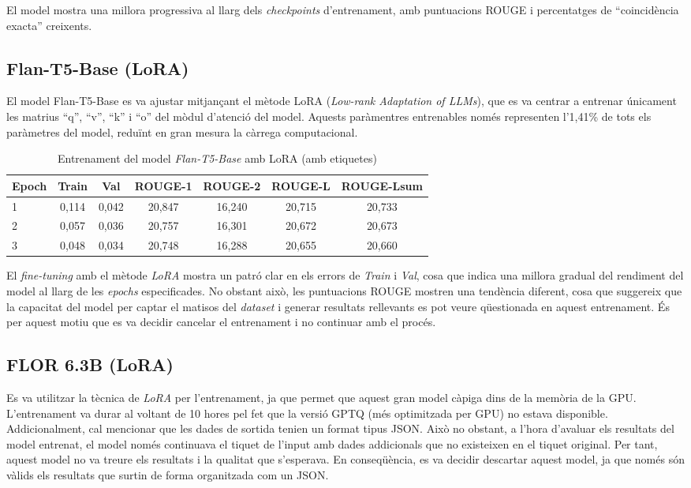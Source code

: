 El model mostra una millora progressiva al llarg dels \textit{checkpoints} d'entrenament, amb puntuacions ROUGE i percentatges de ``coincidència exacta'' creixents.

\subsection{Flan-T5-Base (LoRA)}
El model Flan-T5-Base es va ajustar mitjançant el mètode LoRA (\textit{Low-rank Adaptation of LLMs}), que es va centrar a entrenar únicament les matrius ``q'', ``v'', ``k'' i ``o'' del mòdul d'atenció del model. Aquests paràmentres entrenables només representen l'1,41\% de tots els paràmetres del model, reduïnt en gran mesura la càrrega computacional.
\begin{table}[H]
    \centering
    \label{tab:additional-training}
    \begin{tabular}{lcccccc}
    \toprule
    Epoch & Train & Val & ROUGE-1 & ROUGE-2 & ROUGE-L & ROUGE-Lsum \\
    \midrule
    1 & 0,114 & 0,042 & 20,847 & 16,240 & 20,715 & 20,733 \\
    2 & 0,057 & 0,036 & 20,757 & 16,301 & 20,672 & 20,673 \\
    3 & 0,048 & 0,034 & 20,748 & 16,288 & 20,655 & 20,660 \\
    \bottomrule
    \end{tabular}
    \caption[Entrenament del model \textit{Flan-T5-Base} amb LoRA]{Entrenament del model \textit{Flan-T5-Base} amb LoRA (amb etiquetes)}
\end{table}
El \textit{fine-tuning} amb el mètode \textit{LoRA} mostra un patró clar en els errors de \textit{Train} i \textit{Val}, cosa que indica una millora gradual del rendiment del model al llarg de les \textit{epochs} especificades. No obstant això, les puntuacions ROUGE mostren una tendència diferent, cosa que suggereix que la capacitat del model per captar el matisos del \textit{dataset} i generar resultats rellevants es pot veure qüestionada en aquest entrenament. És per aquest motiu que es va decidir cancelar el entrenament i no continuar amb el procés.


\subsection{FLOR 6.3B (LoRA)}
Es va utilitzar la tècnica de \textit{LoRA} per l'entrenament, ja que permet que aquest gran model càpiga dins de la memòria de la GPU. L'entrenament va durar al voltant de 10 hores pel fet que la versió GPTQ (més optimitzada per GPU) no estava disponible. Addicionalment, cal mencionar que les dades de sortida tenien un format tipus JSON. Això no obstant, a l'hora d'avaluar els resultats del model entrenat, el model només continuava el tiquet de l'input amb dades addicionals que no existeixen en el tiquet original. Per tant, aquest model no va treure els resultats i la qualitat que s'esperava. En conseqüència, es va decidir descartar aquest model, ja que només són vàlids els resultats que surtin de forma organitzada com un JSON.

